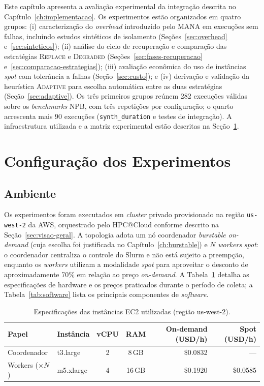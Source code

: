 Este capítulo apresenta a avaliação experimental da integração descrita no
Capítulo~\ref{ch:implementacao}. Os experimentos estão organizados em quatro grupos:
(i) caracterização do \textit{overhead} introduzido pelo MANA em execuções sem falhas,
incluindo estudos sintéticos de isolamento
(Seções~\ref{sec:overhead} e~\ref{sec:sinteticos}); (ii) análise do ciclo de recuperação
e comparação das estratégias \textsc{Replace} e \textsc{Degraded}
(Seções~\ref{sec:fases-recuperacao} e~\ref{sec:comparacao-estrategias}); (iii) avaliação
econômica do uso de instâncias \textit{spot} com tolerância a falhas
(Seção~\ref{sec:custo}); e (iv) derivação e validação da heurística
\textsc{Adaptive} para escolha automática entre as duas estratégias
(Seção~\ref{sec:adaptive}). Os três primeiros grupos reúnem 282 execuções válidas
sobre os \textit{benchmarks} NPB, com três repetições por configuração; o quarto
acrescenta mais 90 execuções (\texttt{synth\_duration} e testes de integração). A
infraestrutura utilizada e a matriz experimental estão descritas na
Seção~\ref{sec:config-exp}.

\section{Configuração dos Experimentos}
\label{sec:config-exp}

\subsection{Ambiente}
\label{sec:ambiente}

Os experimentos foram executados em \textit{cluster} privado provisionado na região
\texttt{us-west-2} da AWS, orquestrado pelo HPC@Cloud conforme descrito na
Seção~\ref{sec:visao-geral}. A topologia adota um nó coordenador \textit{burstable on-demand}
(cuja escolha foi justificada no Capítulo~\ref{ch:burstable}) e $N$ \textit{workers}
\textit{spot}: o coordenador centraliza o controle do Slurm e não está sujeito a
preempção, enquanto os \textit{workers} utilizam a modalidade \textit{spot} para
aproveitar o desconto de aproximadamente 70\% em relação ao preço \textit{on-demand}. A Tabela~\ref{tab:hardware} detalha as especificações de hardware
e os preços praticados durante o período de coleta; a Tabela~\ref{tab:software} lista
os principais componentes de \textit{software}.

\begin{table}[htb]
  \caption{Especificações das instâncias EC2 utilizadas (região us-west-2).}
  \label{tab:hardware}
  \centering
  \begin{tabular}{llccrr}
    \toprule
    Papel & Instância & vCPU & RAM & On-demand (USD/h) & Spot (USD/h) \\
    \midrule
    Coordenador          & t3.large   & 2 & 8\,GB  & \$0.0832 & {---} \\
    Workers ($\times N$) & m5.xlarge  & 4 & 16\,GB & \$0.1920 & \$0.0585 \\
    \bottomrule
  \end{tabular}
\end{table}

